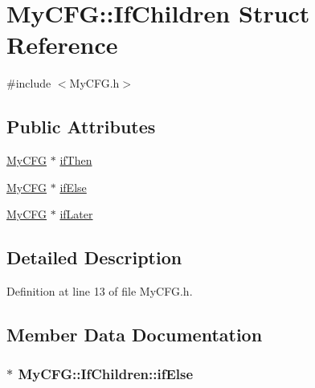 \hypertarget{struct_my_c_f_g_1_1_if_children}{\section{My\-C\-F\-G\-:\-:If\-Children Struct Reference}
\label{struct_my_c_f_g_1_1_if_children}
}


{\ttfamily \#include $<$My\-C\-F\-G.\-h$>$}

\subsection*{Public Attributes}
\begin{DoxyCompactItemize}
\item 
\hyperlink{class_my_c_f_g}{My\-C\-F\-G} $\ast$ \hyperlink{struct_my_c_f_g_1_1_if_children_a54acb9f7d3f9209e69d738c4e8ef7d69}{if\-Then}
\item 
\hyperlink{class_my_c_f_g}{My\-C\-F\-G} $\ast$ \hyperlink{struct_my_c_f_g_1_1_if_children_a1ee75aa289d9cf0b22d59e16a5d3550e}{if\-Else}
\item 
\hyperlink{class_my_c_f_g}{My\-C\-F\-G} $\ast$ \hyperlink{struct_my_c_f_g_1_1_if_children_a0ff9f7a5cf8866b51ee2a9ff3f2669d7}{if\-Later}
\end{DoxyCompactItemize}


\subsection{Detailed Description}


Definition at line 13 of file My\-C\-F\-G.\-h.



\subsection{Member Data Documentation}
\hypertarget{struct_my_c_f_g_1_1_if_children_a1ee75aa289d9cf0b22d59e16a5d3550e}{
\subsubsection[{if\-Else}]{$\ast$ My\-C\-F\-G\-::\-If\-Children\-::if\-Else}}\label{struct_my_c_f_g_1_1_if_children_a1ee75aa289d9cf0b22d59e16a5d3550e}


